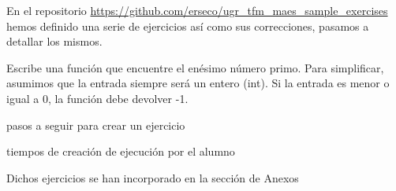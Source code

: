 En el repositorio \url{https://github.com/erseco/ugr_tfm_maes_sample_exercises} hemos definido una serie de ejercicios así como sus correcciones, pasamos a detallar los mismos.


Escribe una función que encuentre el enésimo número primo. Para simplificar, asumimos que la entrada siempre será un entero (int). Si la entrada es menor o igual a 0, la función debe devolver -1.

pasos a seguir para crear un ejercicio

tiempos de creación de ejecución por el alumno

Dichos ejercicios se han incorporado en la sección de Anexos